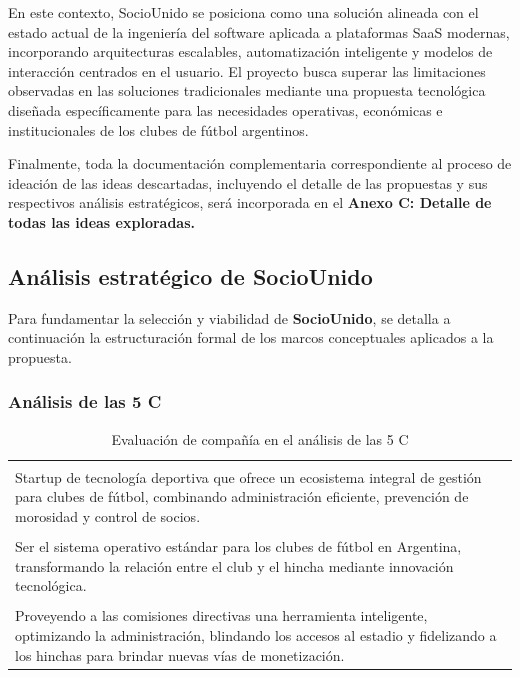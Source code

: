 En este contexto, SocioUnido se posiciona como una solución alineada con el estado actual de la ingeniería del software aplicada a plataformas SaaS modernas, incorporando arquitecturas escalables, automatización inteligente y modelos de interacción centrados en el usuario. El proyecto busca superar las limitaciones observadas en las soluciones tradicionales mediante una propuesta tecnológica diseñada específicamente para las necesidades operativas, económicas e institucionales de los clubes de fútbol argentinos.

Finalmente, toda la documentación complementaria correspondiente al proceso de ideación de las ideas descartadas, incluyendo el detalle de las propuestas y sus respectivos análisis estratégicos, será incorporada en el \textbf{Anexo C: Detalle de todas las ideas exploradas.}

\vspace{0.8cm}

\newpage

\subsection{Análisis estratégico de SocioUnido}

Para fundamentar la selección y viabilidad de \textbf{SocioUnido}, se detalla a continuación la estructuración formal de los marcos conceptuales aplicados a la propuesta.

\subsubsection{Análisis de las 5 C}

\begin{table}[h!]
\centering
\renewcommand{\arraystretch}{1.5}
\begin{tabularx}{\textwidth}{|X|}
\hline
\rowcolor{blue!20} \multicolumn{1}{|c|}{\textbf{COMPAÑÍA}} \\ \hline
\rowcolor{blue!10} \multicolumn{1}{|c|}{\textbf{Descripción}} \\ \hline
Startup de tecnología deportiva que ofrece un ecosistema integral de gestión para clubes de fútbol, combinando administración eficiente, prevención de morosidad y control de socios. \\ \hline
\rowcolor{blue!10} \multicolumn{1}{|c|}{\textbf{Visión}} \\ \hline
Ser el sistema operativo estándar para los clubes de fútbol en Argentina, transformando la relación entre el club y el hincha mediante innovación tecnológica. \\ \hline
\rowcolor{blue!10} \multicolumn{1}{|c|}{\textbf{Misión}} \\ \hline
Proveyendo a las comisiones directivas una herramienta inteligente, optimizando la administración, blindando los accesos al estadio y fidelizando a los hinchas para brindar nuevas vías de monetización. \\ \hline
\end{tabularx}
\caption{Evaluación de compañía en el análisis de las 5 C}
\label{tab:tabla_compania}
\end{table}

